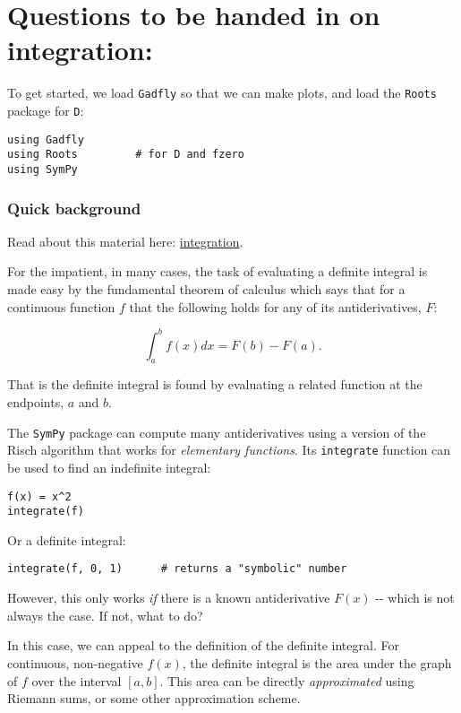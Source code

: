 \documentclass[12pt]{article}
\begin{document}
\section{Questions to be handed in on integration:}

To get started, we load \texttt{Gadfly} so that we can make plots, and
load the \texttt{Roots} package for \texttt{D}:



\begin{verbatim}
using Gadfly
using Roots         # for D and fzero
using SymPy
\end{verbatim}
\subsubsection{Quick background}

Read about this material here:
\href{http://mth229.github.io/integration.html}{integration}.

For the impatient, in many cases, the task of evaluating a definite
integral is made easy by the fundamental theorem of calculus which says
that for a continuous function $f$ that the following holds for any of
its antiderivatives, $F$:

\[
\int_a^b f(x) dx = F(b) - F(a).
\]

That is the definite integral is found by evaluating a related function
at the endpoints, $a$ and $b$.

The \texttt{SymPy} package can compute many antiderivatives using a
version of the Risch algorithm that works for \emph{elementary
functions}. Its \texttt{integrate} function can be used to find an
indefinite integral:



\begin{verbatim}
f(x) = x^2
integrate(f)
\end{verbatim}
Or a definite integral:



\begin{verbatim}
integrate(f, 0, 1)      # returns a "symbolic" number
\end{verbatim}
However, this only works \emph{if} there is a known antiderivative
$F(x)$ -{}- which is not always the case. If not, what to do?

In this case, we can appeal to the definition of the definite integral.
For continuous, non-negative $f(x)$, the definite integral is the area
under the graph of $f$ over the interval $[a,b]$. This area can be
directly \emph{approximated} using Riemann sums, or some other
approximation scheme.
\end{document}
